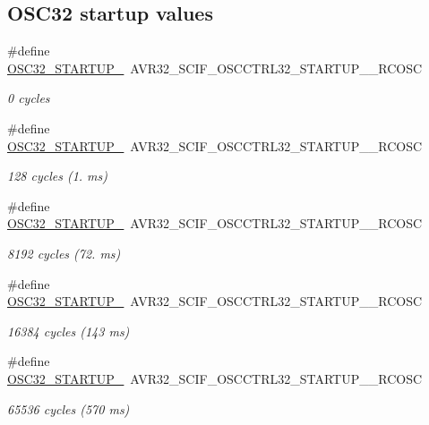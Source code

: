 \subsection*{\-O\-S\-C32 startup values}
\begin{DoxyCompactItemize}
\item 
\#define \hyperlink{group__osc__group_gad8bcd39c7f6e46641d17cee3462155cc}{\-O\-S\-C32\-\_\-\-S\-T\-A\-R\-T\-U\-P\-\_}~\-A\-V\-R32\-\_\-\-S\-C\-I\-F\-\_\-\-O\-S\-C\-C\-T\-R\-L32\-\_\-\-S\-T\-A\-R\-T\-U\-P\-\_\-\_\-\-R\-C\-O\-S\-C
\begin{DoxyCompactList}\small\item\em 0 cycles \end{DoxyCompactList}\item 
\#define \hyperlink{group__osc__group_gaeb8c0da95ac96d2b39e5ac6d67798a90}{\-O\-S\-C32\-\_\-\-S\-T\-A\-R\-T\-U\-P\-\_}~\-A\-V\-R32\-\_\-\-S\-C\-I\-F\-\_\-\-O\-S\-C\-C\-T\-R\-L32\-\_\-\-S\-T\-A\-R\-T\-U\-P\-\_\-\_\-\-R\-C\-O\-S\-C
\begin{DoxyCompactList}\small\item\em 128 cycles (1. ms) \end{DoxyCompactList}\item 
\#define \hyperlink{group__osc__group_gabafebd75ae17fa2453c6ae3ffae8afed}{\-O\-S\-C32\-\_\-\-S\-T\-A\-R\-T\-U\-P\-\_}~\-A\-V\-R32\-\_\-\-S\-C\-I\-F\-\_\-\-O\-S\-C\-C\-T\-R\-L32\-\_\-\-S\-T\-A\-R\-T\-U\-P\-\_\-\_\-\-R\-C\-O\-S\-C
\begin{DoxyCompactList}\small\item\em 8192 cycles (72. ms) \end{DoxyCompactList}\item 
\#define \hyperlink{group__osc__group_ga1d51c4a86bfc57bd922f3adc9ee69043}{\-O\-S\-C32\-\_\-\-S\-T\-A\-R\-T\-U\-P\-\_}~\-A\-V\-R32\-\_\-\-S\-C\-I\-F\-\_\-\-O\-S\-C\-C\-T\-R\-L32\-\_\-\-S\-T\-A\-R\-T\-U\-P\-\_\-\_\-\-R\-C\-O\-S\-C
\begin{DoxyCompactList}\small\item\em 16384 cycles (143 ms) \end{DoxyCompactList}\item 
\#define \hyperlink{group__osc__group_gadcdb3baf55f807417ff680c67f242662}{\-O\-S\-C32\-\_\-\-S\-T\-A\-R\-T\-U\-P\-\_}~\-A\-V\-R32\-\_\-\-S\-C\-I\-F\-\_\-\-O\-S\-C\-C\-T\-R\-L32\-\_\-\-S\-T\-A\-R\-T\-U\-P\-\_\-\_\-\-R\-C\-O\-S\-C
\begin{DoxyCompactList}\small\item\em 65536 cycles (570 ms) \end{DoxyCompactList}\item 

\end{DoxyCompactItemize}
